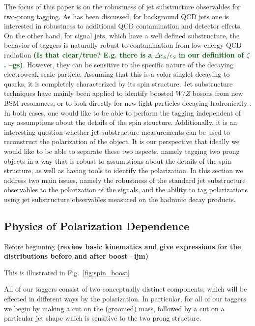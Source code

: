 \documentclass[11pt,letterpaper]{article}
\DeclareRobustCommand{\Fig}[1]{Fig.~\ref{#1}}
\newcommand{\ijm}[1]{\textbf{\textcolor{llblue}{(#1 --ijm)}}}
\newcommand{\gs}[1]{\textbf{\textcolor{darkgreen}{(#1 --gs)}}}
\begin{document}
The focus of this paper is on the robustness of jet substructure
observables for two-prong tagging. As has been discussed, for
background QCD jets one is interested in robustness to additional QCD
contamination and detector effects. On the other hand, for signal
jets, which have a well defined substructure, the behavior of taggers
is naturally robust to contamination from low energy QCD radiation
\gs{Is that clear/true? E.g. there is a $\Delta\epsilon_S/\epsilon_S$
  in our definition of $\zeta$.}. However, they can be sensitive to the
specific nature of the decaying electroweak scale particle. Assuming
that this is a color singlet decaying to quarks, it is completely
characterized by its spin structure. Jet substructure techniques have
mainly been applied to identify boosted $W/Z$ bosons from new BSM
resonances, or to look directly for new light particles decaying
hadronically \cite{CMS-PAS-EXO-17-001}. In both cases, one would like
to be able to perform the tagging independent of any assumptions about
the details of the spin structure. Additionally, it is an interesting
question whether jet substructure measurements can be used to
reconstruct the polarization of the object. It is our perspective that
ideally we would like to be able to separate these two aspects, namely
tagging two prong objects in a way that is robust to assumptions about
the details of the spin structure, as well as having tools to identify
the polarization. In this section we address two main issues, namely
the robustness of the standard jet substructure observables to the
polarization of the signals, and the ability to tag polarizations
using jet substructure observables measured on the hadronic decay
products.



\subsection{Physics of Polarization Dependence}\label{sec:polar_physics}

Before beginning \ijm{review basic kinematics and give expressions for the distributions before and after boost}

This is illustrated in \Fig{fig:spin_boost}



All of our taggers consist of two conceptually distinct components, which will be effected in different ways by the polarization. In particular, for all of our taggers we begin by making a cut on the (groomed) mass, followed by a cut on a particular jet shape which is sensitive to the two prong structure.
\end{document}
